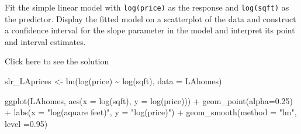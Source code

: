 \documentclass[
  letterpaper,
  DIV=11,
  numbers=noendperiod]{scrartcl}
\newenvironment{Shaded}{\begin{snugshade}}{\end{snugshade}}
\newcommand{\AttributeTok}[1]{\textcolor[rgb]{0.40,0.45,0.13}{#1}}
\newcommand{\FloatTok}[1]{\textcolor[rgb]{0.68,0.00,0.00}{#1}}
\newcommand{\FunctionTok}[1]{\textcolor[rgb]{0.28,0.35,0.67}{#1}}
\newcommand{\NormalTok}[1]{\textcolor[rgb]{0.00,0.23,0.31}{#1}}
\newcommand{\OtherTok}[1]{\textcolor[rgb]{0.00,0.23,0.31}{#1}}
\newcommand{\SpecialCharTok}[1]{\textcolor[rgb]{0.37,0.37,0.37}{#1}}
\newcommand{\StringTok}[1]{\textcolor[rgb]{0.13,0.47,0.30}{#1}}
\begin{document}
\begin{tcolorbox}[enhanced jigsaw, titlerule=0mm, colbacktitle=quarto-callout-warning-color!10!white, opacityback=0, left=2mm, rightrule=.15mm, toptitle=1mm, opacitybacktitle=0.6, colback=white, coltitle=black, breakable, bottomrule=.15mm, arc=.35mm, bottomtitle=1mm, title={Task 2}, toprule=.15mm, leftrule=.75mm, colframe=quarto-callout-warning-color-frame]

Fit the simple linear model with \texttt{log(price)} as the response and
\texttt{log(sqft)} as the predictor. Display the fitted model on a
scatterplot of the data and construct a confidence interval for the
slope parameter in the model and interpret its point and interval
estimates.

Click here to see the solution

\begin{Shaded}
\begin{Highlighting}[]
\NormalTok{slr\_LAprices }\OtherTok{\textless{}{-}} \FunctionTok{lm}\NormalTok{(}\FunctionTok{log}\NormalTok{(price) }\SpecialCharTok{\textasciitilde{}} \FunctionTok{log}\NormalTok{(sqft), }\AttributeTok{data =}\NormalTok{ LAhomes)}

\FunctionTok{ggplot}\NormalTok{(LAhomes, }\FunctionTok{aes}\NormalTok{(}\AttributeTok{x =}  \FunctionTok{log}\NormalTok{(sqft), }\AttributeTok{y =} \FunctionTok{log}\NormalTok{(price))) }\SpecialCharTok{+}
  \FunctionTok{geom\_point}\NormalTok{(}\AttributeTok{alpha=}\FloatTok{0.25}\NormalTok{) }\SpecialCharTok{+}
  \FunctionTok{labs}\NormalTok{(}\AttributeTok{x =} \StringTok{"log(aquare feet)"}\NormalTok{, }\AttributeTok{y =} \StringTok{"log(price)"}\NormalTok{) }\SpecialCharTok{+}
  \FunctionTok{geom\_smooth}\NormalTok{(}\AttributeTok{method =} \StringTok{"lm"}\NormalTok{, }\AttributeTok{level =}\FloatTok{0.95}\NormalTok{)}
\end{Highlighting}
\end{Shaded}


\end{tcolorbox}
\end{document}
